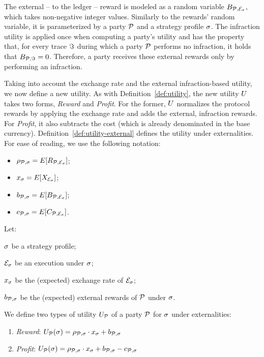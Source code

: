 The external -- to the ledger -- reward is modeled as a random variable
$B_{\mathcal{P}, \mathcal{E}_\sigma}$, which takes non-negative integer
values. Similarly to the rewards' random variable, it is
parameterized by a
party $\mathcal{P}$ and a strategy profile $\sigma$.  The infraction utility is
applied once when computing a party's utility and has the property that, for
every trace $\Im$ during which a party $\mathcal{P}$ performs no
infraction, it holds that $B_{\mathcal{P}, \Im} = 0$.
Therefore, a party receives these external rewards only by performing an
infraction.

Taking into account the exchange rate and the external infraction-based
utility, we now define a new utility. As with
Definition~\ref{def:utility}, the new utility $U$ takes two forms,
\emph{Reward} and \emph{Profit}. For the former, $U$ normalizes the protocol
rewards by applying the exchange rate and adds the external, infraction
rewards. For \emph{Profit}, it also subtracts the cost (which is already
denominated in the base currency). Definition~\ref{def:utility-external} defines the utility under
externalities. For ease of reading, we use the following notation:
\begin{itemize}
    \item $\rho_{\mathcal{P}, \sigma} = E[R_{\mathcal{P}, \mathcal{E}_\sigma}]$;
    \item $x_\sigma = E[X_{\mathcal{E}_\sigma}]$;
    \item $b_{\mathcal{P}, \sigma} = E[B_{\mathcal{P}, \mathcal{E}_{\sigma}}]$;
    \item $c_{\mathcal{P}, \sigma} = E[C_{\mathcal{P}, \mathcal{E}_\sigma}]$.
\end{itemize}

\begin{definition}\label{def:utility-external}
    Let:
    \begin{inparaenum}[i)]
        \item $\sigma$ be a strategy profile;
        \item $\mathcal{E}_\sigma$ be an execution under $\sigma$;
        \item $x_{\sigma}$ be the (expected) exchange rate of $\mathcal{E}_\sigma$;
        \item $b_{\mathcal{P}, \sigma}$ be the (expected) external rewards of $\mathcal{P}$ under $\sigma$.
    \end{inparaenum}
    We define two types of utility $U_{\mathcal{P}}$ of a party $\mathcal{P}$ for
    $\sigma$ under externalities:
    \begin{enumerate}
        \item \emph{Reward}: $U_{\mathcal{P}}(\sigma) = \rho_{\mathcal{P}, \sigma} \cdot x_\sigma + b_{\mathcal{P}, \sigma}$
        \item \emph{Profit}: $U_{\mathcal{P}}(\sigma) = \rho_{\mathcal{P}, \sigma} \cdot x_\sigma + b_{\mathcal{P}, \sigma} - c_{\mathcal{P}, \sigma}$
    \end{enumerate}
\end{definition}
